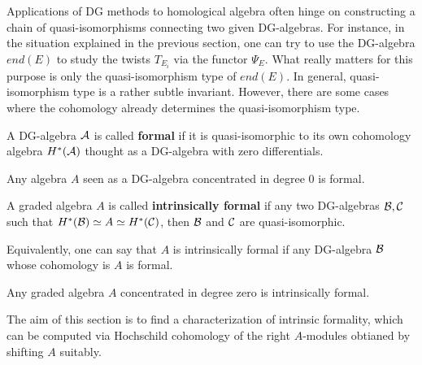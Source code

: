 

Applications of DG methods to homological algebra 
often hinge on constructing a chain of quasi-isomorphisms 
connecting two given DG-algebras. 
For instance, in the situation explained in the previous  section, 
one can try to use the DG-algebra $end(E)$ to study the twists
$T_{E_{i}}$ via the functor $\Psi_{E}$. 
What really matters for this purpose is only the quasi-isomorphism type of $end(E)$. 
In general, quasi-isomorphism type is a rather subtle invariant.
 However, there are some cases where the cohomology already determines the quasi-isomorphism type.
 
\begin{df}
	A DG-algebra $\mathcal{A}$ is called \textbf{formal} if
	it is quasi-isomorphic to its own cohomology algebra $H^{*}(\mathcal{A})$
	thought as a DG-algebra with zero differentials.
\end{df}

\begin{ex}
	Any algebra $A$ seen as a DG-algebra concentrated in degree $0$ is formal.
\end{ex}

\begin{df}
	A graded algebra $A$ is called \textbf{intrinsically formal}
	if any two DG-algebras $\mathcal{B}, \mathcal{C}$ such that $H^{*}(\mathcal{B}) \simeq A \simeq H^{*}(\mathcal{C})$,
	then $\mathcal{B}$ and $\mathcal{C}$ are quasi-isomorphic.
\end{df}

Equivalently, one can say that $A$ is intrinsically formal if any DG-algebra $\mathcal{B}$
whose cohomology is $A$ is formal.

\begin{ex}
	Any graded algebra $A$ concentrated in degree zero is intrinsically formal.
\end{ex}

The aim of this section is to find a characterization of intrinsic formality,
which can be computed via Hochschild cohomology of the right $A$-modules obtianed
by shifting $A$ suitably.